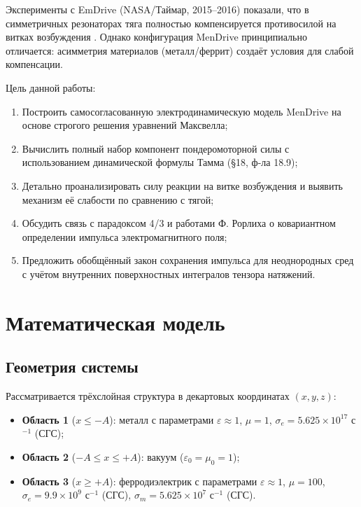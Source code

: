 \documentclass[a4paper,12pt]{article}
\begin{document}
Эксперименты с EmDrive (NASA/Таймар, 2015--2016) показали, что в симметричных
резонаторах тяга полностью компенсируется противосилой на витках возбуждения
\cite{Tajmar2016}. Однако конфигурация MenDrive принципиально отличается:
асимметрия материалов (металл/феррит) создаёт условия для слабой компенсации.

Цель данной работы:
\begin{enumerate}
    \item Построить самосогласованную электродинамическую модель MenDrive
    на основе строгого решения уравнений Максвелла;
    \item Вычислить полный набор компонент пондеромоторной силы с использованием
    динамической формулы Тамма (\S 18, ф-ла 18.9);
    \item Детально проанализировать силу реакции на витке возбуждения и выявить
    механизм её слабости по сравнению с тягой;
    \item Обсудить связь с парадоксом 4/3 и работами Ф. Рорлиха о ковариантном
    определении импульса электромагнитного поля;
    \item Предложить обобщённый закон сохранения импульса для неоднородных сред
    с учётом внутренних поверхностных интегралов тензора натяжений.
\end{enumerate}

\section{Математическая модель}

\subsection{Геометрия системы}

Рассматривается трёхслойная структура в декартовых координатах $(x, y, z)$:

\begin{itemize}
    \item \textbf{Область 1} ($x \leq -A$): металл с параметрами
    $\varepsilon \approx 1$, $\mu = 1$,
    $\sigma_e = 5.625 \times 10^{17}$ с$^{-1}$ (СГС);
    \item \textbf{Область 2} ($-A \leq x \leq +A$): вакуум
    ($\varepsilon_0 = \mu_0 = 1$);
    \item \textbf{Область 3} ($x \geq +A$): ферродиэлектрик с параметрами
    $\varepsilon \approx 1$, $\mu = 100$,  $\sigma_e = 9.9 \times 10^{9}$ с$^{-1}$ (СГС), $\sigma_m = 5.625 \times 10^{7}$ с$^{-1}$ (СГС).
\end{itemize}
\end{document}
